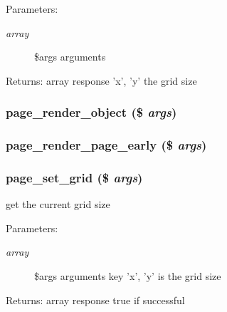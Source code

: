 \begin{Desc}
\item[Parameters:]
\begin{description}
\item[{\em array}]\$args arguments \end{description}
\end{Desc}
\begin{Desc}
\item[Returns:]array response 'x', 'y' the grid size \end{Desc}
\hypertarget{module__page_8inc_8php_53e7091b9a654d0d772cea6e3127820e}{
\subsubsection[{page\_\-render\_\-object}]{\setlength{\rightskip}{0pt plus 5cm}page\_\-render\_\-object (\$ {\em args})}}
\label{module__page_8inc_8php_53e7091b9a654d0d772cea6e3127820e}


\hypertarget{module__page_8inc_8php_80aff2ea069c7a2ba120e26bb218efa5}{
\subsubsection[{page\_\-render\_\-page\_\-early}]{\setlength{\rightskip}{0pt plus 5cm}page\_\-render\_\-page\_\-early (\$ {\em args})}}
\label{module__page_8inc_8php_80aff2ea069c7a2ba120e26bb218efa5}


\hypertarget{module__page_8inc_8php_aadab51471c838ab9a0fa0c93a04b817}{
\subsubsection[{page\_\-set\_\-grid}]{\setlength{\rightskip}{0pt plus 5cm}page\_\-set\_\-grid (\$ {\em args})}}
\label{module__page_8inc_8php_aadab51471c838ab9a0fa0c93a04b817}


get the current grid size

\begin{Desc}
\item[Parameters:]
\begin{description}
\item[{\em array}]\$args arguments key 'x', 'y' is the grid size \end{description}
\end{Desc}
\begin{Desc}
\item[Returns:]array response true if successful \end{Desc}
